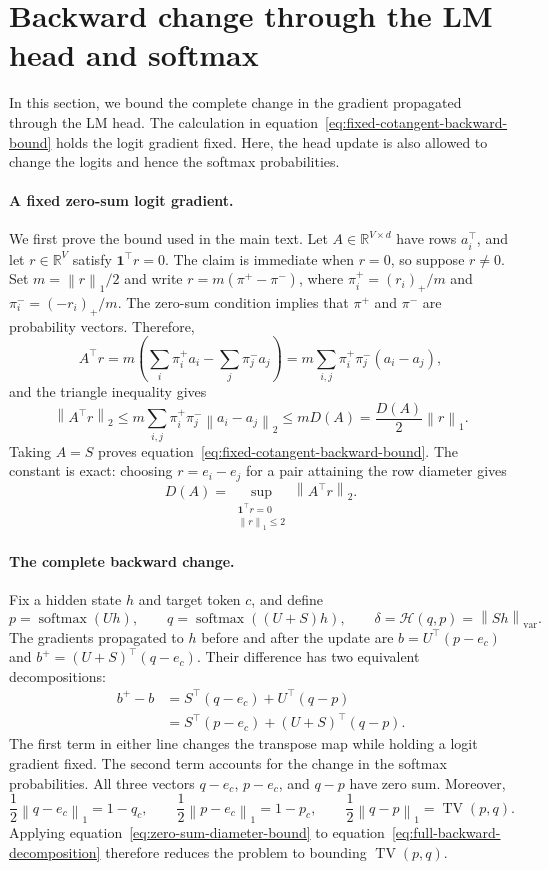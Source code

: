 \documentclass[anon]{opt2026} %
\newcommand{\R}{\mathbb{R}}
\newcommand{\one}{\mathbf{1}}
\newcommand{\norm}[1]{\left\lVert #1\right\rVert}
\newcommand{\varnorm}[1]{\left\lVert #1\right\rVert_{\mathrm{var}}}
\DeclareMathOperator{\softmax}{softmax}
\begin{document}
\section{Backward change through the LM head and softmax}
\label{app:lm-head-backward-change}

In this section, we bound the complete change in the gradient propagated
through the LM head. The calculation in
equation~\ref{eq:fixed-cotangent-backward-bound} holds the logit gradient
fixed. Here, the head update is also allowed to change the logits and hence
the softmax probabilities.

\paragraph{A fixed zero-sum logit gradient.}
We first prove the bound used in the main text. Let
$A\in\R^{V\times d}$ have rows $a_i^\top$, and let
$r\in\R^V$ satisfy $\one^\top r=0$. The claim is immediate when $r=0$, so
suppose $r\neq0$. Set $m=\norm{r}_1/2$ and write
$r=m(\pi^+-\pi^-)$, where
$\pi^+_i=(r_i)_+/m$ and $\pi^-_i=(-r_i)_+/m$. The zero-sum condition
implies that $\pi^+$ and $\pi^-$ are probability vectors. Therefore,
\[
A^\top r
=
m\left(\sum_i\pi^+_i a_i-\sum_j\pi^-_j a_j\right)
=
m\sum_{i,j}\pi^+_i\pi^-_j(a_i-a_j),
\]
and the triangle inequality gives
\begin{equation}
\norm{A^\top r}_2
\leq
m\sum_{i,j}\pi^+_i\pi^-_j\norm{a_i-a_j}_2
\leq
mD(A)
=
\frac{D(A)}{2}\norm{r}_1.
\label{eq:zero-sum-diameter-bound}
\end{equation}
Taking $A=S$ proves
equation~\ref{eq:fixed-cotangent-backward-bound}. The constant is exact:
choosing $r=e_i-e_j$ for a pair attaining the row diameter gives
\[
D(A)
=
\sup_{\substack{\one^\top r=0\\\norm{r}_1\leq2}}
\norm{A^\top r}_2.
\]

\paragraph{The complete backward change.}
Fix a hidden state $h$ and target token $c$, and define
\[
p=\softmax(Uh),
\qquad
q=\softmax((U+S)h),
\qquad
\delta=\mathcal H(q,p)=\varnorm{Sh}.
\]
The gradients propagated to $h$ before and after the update are
$b=U^\top(p-e_c)$ and $b^+=(U+S)^\top(q-e_c)$. Their difference has two equivalent decompositions:
\begin{equation}
\begin{aligned}
b^+-b
&=S^\top(q-e_c)+U^\top(q-p)\\
&=S^\top(p-e_c)+(U+S)^\top(q-p).
\end{aligned}
\label{eq:full-backward-decomposition}
\end{equation}
The first term in either line changes the transpose map while holding a logit gradient fixed. The second term accounts for the change in the softmax probabilities. All three vectors $q-e_c$, $p-e_c$, and $q-p$ have zero sum. Moreover,
\[
\frac{1}{2}\norm{q-e_c}_1=1-q_c,
\qquad
\frac{1}{2}\norm{p-e_c}_1=1-p_c,
\qquad
\frac{1}{2}\norm{q-p}_1=\operatorname{TV}(p,q).
\]
Applying equation~\ref{eq:zero-sum-diameter-bound} to equation~\ref{eq:full-backward-decomposition} therefore reduces the problem to bounding $\operatorname{TV}(p,q)$.
\end{document}
